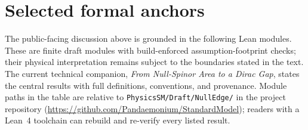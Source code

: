\documentclass[11pt]{article}
\begin{document}
\appendix
\section{Selected formal anchors}

The public-facing discussion above is grounded in the following Lean modules.
These are finite draft modules with build-enforced assumption-footprint checks;
their physical interpretation remains subject to the boundaries stated in the
text.  The current technical companion, \emph{From Null-Spinor Area to a Dirac
Gap}, states the central results with full definitions, conventions, and
provenance.  Module paths in the table are relative to
\texttt{PhysicsSM/Draft/NullEdge/} in the project repository
(\url{https://github.com/Pandaemonium/StandardModel}); readers with a Lean~4
toolchain can rebuild and re-verify every listed result.
\end{document}
